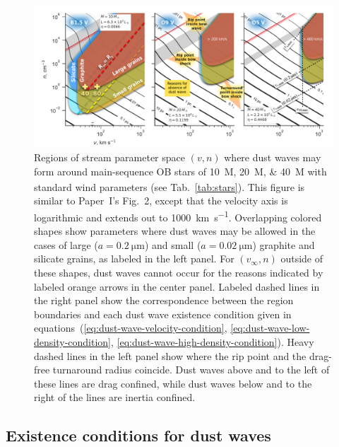 \begin{figure}
  \centering
  \includegraphics[width=\linewidth]{figs/existence-dust-wave}
  \caption{Regions of stream parameter space \((v, n)\) where dust
    waves may form around main-sequence OB stars of
    \SIlist{10;20;40}{M_\odot} with standard wind parameters (see
    Tab.~\ref{tab:stars}).  This figure is similar to Paper~I's
    Fig.~2, except that the velocity axis is logarithmic and extends
    out to \SI{1000}{km.s^{-1}}.  Overlapping colored shapes show
    parameters where dust waves may be allowed in the cases of large
    (\(a = \SI{0.2}{\um}\)) and small (\(a = \SI{0.02}{\um}\))
    graphite and silicate grains, as labeled in the left panel.  For
    \((v_\infty, n)\) outside of these shapes, dust waves cannot occur for
    the reasons indicated by labeled orange arrows in the center
    panel.  Labeled dashed lines in the right panel show the
    correspondence between the region boundaries and each dust wave
    existence condition given in
    equations~(\ref{eq:dust-wave-velocity-condition},
    \ref{eq:dust-wave-low-density-condition},
    \ref{eq:dust-wave-high-density-condition}). Heavy dashed lines in
    the left panel show where the rip point and the drag-free
    turnaround radius coincide.  Dust waves above and to the left of
    these lines are drag confined, while dust waves below and to the
    right of the lines are inertia confined.  }
  \label{fig:existence-dust-wave}
\end{figure}

\subsection{Existence conditions for dust waves}
\label{sec:exist-cond-separ}

